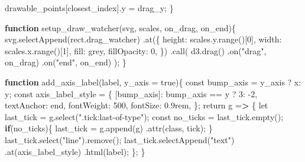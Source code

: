 \documentclass[print]{nuthesis}
\newenvironment{Shaded}{\begin{snugshade}}{\end{snugshade}}
\newcommand{\AttributeTok}[1]{\textcolor[rgb]{0.77,0.63,0.00}{#1}}
\newcommand{\ControlFlowTok}[1]{\textcolor[rgb]{0.13,0.29,0.53}{\textbf{#1}}}
\newcommand{\DecValTok}[1]{\textcolor[rgb]{0.00,0.00,0.81}{#1}}
\newcommand{\ErrorTok}[1]{\textcolor[rgb]{0.64,0.00,0.00}{\textbf{#1}}}
\newcommand{\FunctionTok}[1]{\textcolor[rgb]{0.00,0.00,0.00}{#1}}
\newcommand{\NormalTok}[1]{#1}
\newcommand{\OtherTok}[1]{\textcolor[rgb]{0.56,0.35,0.01}{#1}}
\newcommand{\SpecialCharTok}[1]{\textcolor[rgb]{0.00,0.00,0.00}{#1}}
\newcommand{\StringTok}[1]{\textcolor[rgb]{0.31,0.60,0.02}{#1}}
\begin{document}
\begin{Shaded}
\begin{Highlighting}[]
\NormalTok{drawable\_points[closest\_index].y }\OtherTok{=}\NormalTok{ drag\_y;}
\NormalTok{\}}

\ControlFlowTok{function} \FunctionTok{setup\_draw\_watcher}\NormalTok{(svg, scales, on\_drag, on\_end)\{}
  \FunctionTok{svg.selectAppend}\NormalTok{(}\StringTok{\textquotesingle{}rect.drag\_watcher\textquotesingle{}}\NormalTok{)}
  \FunctionTok{.at}\NormalTok{(\{}
\NormalTok{    height}\SpecialCharTok{:} \FunctionTok{scales.y.range}\NormalTok{()[}\DecValTok{0}\NormalTok{],}
\NormalTok{    width}\SpecialCharTok{:} \FunctionTok{scales.x.range}\NormalTok{()[}\DecValTok{1}\NormalTok{],}
\NormalTok{    fill}\SpecialCharTok{:} \StringTok{\textquotesingle{}grey\textquotesingle{}}\NormalTok{,}
\NormalTok{    fillOpacity}\SpecialCharTok{:} \DecValTok{0}\NormalTok{,}
\NormalTok{  \})}
  \FunctionTok{.call}\NormalTok{(}
    \FunctionTok{d3.drag}\NormalTok{()}
    \FunctionTok{.on}\NormalTok{(}\StringTok{"drag"}\NormalTok{, on\_drag)}
    \FunctionTok{.on}\NormalTok{(}\StringTok{"end"}\NormalTok{, on\_end)}
\NormalTok{  );}
\NormalTok{\}}

\ControlFlowTok{function} \FunctionTok{add\_axis\_label}\NormalTok{(label, }\AttributeTok{y\_axis =}\NormalTok{ true)\{}
\NormalTok{  const bump\_axis }\OtherTok{=}\NormalTok{ y\_axis ? }\StringTok{\textquotesingle{}x\textquotesingle{}}\SpecialCharTok{:} \StringTok{\textquotesingle{}y\textquotesingle{}}\NormalTok{;}
\NormalTok{  const axis\_label\_style }\OtherTok{=}\NormalTok{ \{}
\NormalTok{    [bump\_axis]}\SpecialCharTok{:}\NormalTok{ bump\_axis }\SpecialCharTok{==} \StringTok{\textquotesingle{}y\textquotesingle{}}\NormalTok{ ? }\DecValTok{3}\SpecialCharTok{:} \SpecialCharTok{{-}}\DecValTok{2}\NormalTok{,}
\NormalTok{    textAnchor}\SpecialCharTok{:} \StringTok{\textquotesingle{}end\textquotesingle{}}\NormalTok{,}
\NormalTok{    fontWeight}\SpecialCharTok{:} \StringTok{\textquotesingle{}500\textquotesingle{}}\NormalTok{,}
\NormalTok{    fontSize}\SpecialCharTok{:} \StringTok{\textquotesingle{}0.9rem\textquotesingle{}}\NormalTok{,}
\NormalTok{  \};}
\NormalTok{  return g }\OtherTok{=}\ErrorTok{\textgreater{}}\NormalTok{ \{}
\NormalTok{    let last\_tick }\OtherTok{=} \FunctionTok{g.select}\NormalTok{(}\StringTok{".tick:last{-}of{-}type"}\NormalTok{);}
\NormalTok{    const no\_ticks }\OtherTok{=} \FunctionTok{last\_tick.empty}\NormalTok{();}
    \ControlFlowTok{if}\NormalTok{(no\_ticks)\{}
\NormalTok{      last\_tick }\OtherTok{=} \FunctionTok{g.append}\NormalTok{(}\StringTok{\textquotesingle{}g\textquotesingle{}}\NormalTok{)}
      \FunctionTok{.attr}\NormalTok{(}\StringTok{\textquotesingle{}class\textquotesingle{}}\NormalTok{, }\StringTok{\textquotesingle{}tick\textquotesingle{}}\NormalTok{);}
\NormalTok{    \}}
    \FunctionTok{last\_tick.select}\NormalTok{(}\StringTok{"line"}\NormalTok{)}\FunctionTok{.remove}\NormalTok{();}
    \FunctionTok{last\_tick.selectAppend}\NormalTok{(}\StringTok{"text"}\NormalTok{)}
    \FunctionTok{.at}\NormalTok{(axis\_label\_style)}
    \FunctionTok{.html}\NormalTok{(label);}
\NormalTok{  \};}
\NormalTok{\}}


\end{Highlighting}
\end{Shaded}
\end{document}
